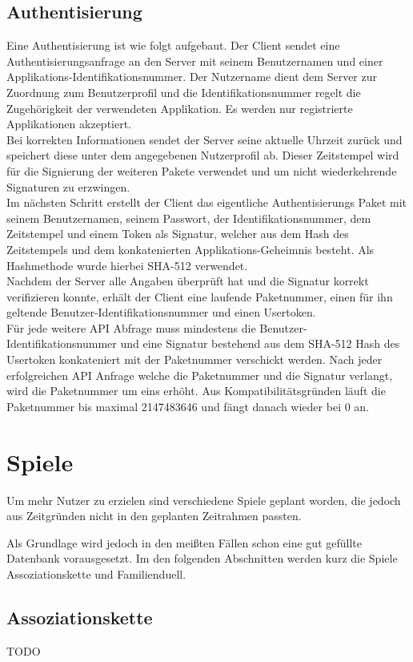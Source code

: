 \subsection{Authentisierung}
Eine Authentisierung ist wie folgt aufgebaut.
Der Client sendet eine Authentisierungsanfrage an den Server mit seinem
Benutzernamen und einer Applikations-Identifikationsnummer. Der Nutzername
dient dem Server zur Zuordnung zum Benutzerprofil und die Identifikationsnummer
regelt die Zugehörigkeit der verwendeten Applikation. Es werden nur registrierte
Applikationen akzeptiert.\\
Bei korrekten Informationen sendet der Server seine aktuelle Uhrzeit zurück
und speichert diese unter dem angegebenen Nutzerprofil ab. Dieser Zeitstempel
wird für die Signierung der weiteren Pakete verwendet und um nicht wiederkehrende
Signaturen zu erzwingen.\\
Im nächsten Schritt erstellt der Client das eigentliche Authentisierungs Paket mit
seinem Benutzernamen, seinem Passwort, der Identifikationsnummer, dem Zeitstempel
und einem Token als Signatur, welcher aus dem Hash des Zeitstempels und dem
konkatenierten Applikations-Geheimnis besteht. Als Hashmethode wurde hierbei
SHA-512 verwendet.\\
Nachdem der Server alle Angaben überprüft hat und die Signatur korrekt
verifizieren konnte, erhält der Client eine laufende Paketnummer, einen für ihn
geltende Benutzer-Identifikationsnummer und einen Usertoken.\\
Für jede weitere API Abfrage muss mindestens die Benutzer-Identifikationsnummer
und eine Signatur bestehend aus dem SHA-512 Hash des Usertoken konkateniert mit
der Paketnummer verschickt werden. Nach jeder erfolgreichen API Anfrage welche
die Paketnummer und die Signatur verlangt, wird die Paketnummer um eins erhöht.
Aus Kompatibilitätsgründen läuft die Paketnummer bis maximal 2147483646 und
fängt danach wieder bei 0 an.


\section{Spiele}
Um mehr Nutzer zu erzielen sind verschiedene Spiele geplant worden, die jedoch
aus Zeitgründen nicht in den geplanten Zeitrahmen passten.

Als Grundlage wird jedoch in den meißten Fällen schon eine gut gefüllte Datenbank
vorausgesetzt. Im den folgenden Abschnitten werden kurz die Spiele Assoziationskette und Familienduell.

\subsection*{Assoziationskette}
TODO

